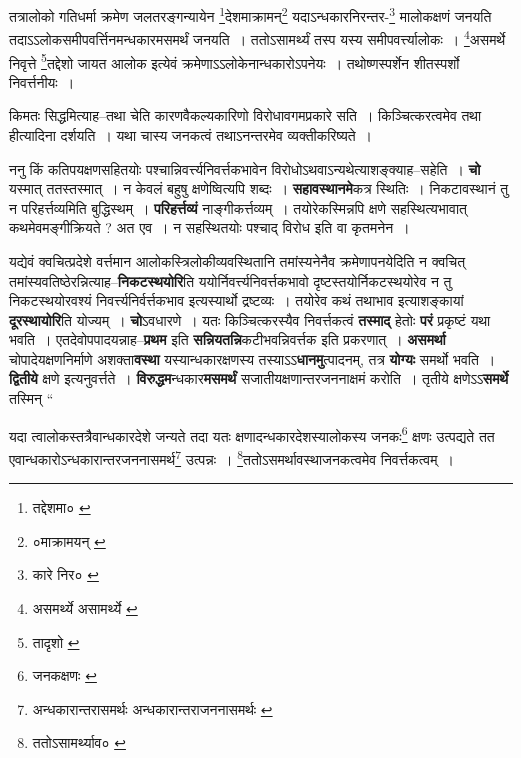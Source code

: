 \documentclass[article,12pt,a4paper]{memoir}
\begin{document}
	  \pstart तत्रालोको गतिधर्मा क्रमेण जलतरङ्गन्यायेन \footnote{तद्देशमा० \cite{dp-msC} \cite{dp-msD}}\-देशमाक्रामन्\footnote{०माक्रामयन् \cite{dp-msB} \cite{dp-edN}} यदाऽन्धकारनिरन्तर-\footnote{कारे निर० \cite{dp-msA} \cite{dp-msB} \cite{dp-edP} \cite{dp-edH} \cite{dp-edE} \cite{dp-edN}} मालोकक्षणं जनयति तदाऽऽलोकसमीपवर्त्तिनमन्धकारमसमर्थं जनयति । ततोऽसामर्थ्यं तस्प यस्य समीपवर्त्त्यालोकः । \footnote{असमर्थ्ये \cite{dp-msA} असामर्थ्ये \cite{dp-edP} \cite{dp-edH} \cite{dp-edE} \cite{dp-edN}}\-असमर्थे निवृत्ते \footnote{तादृशो \cite{dp-msA} \cite{dp-msB} \cite{dp-edP} \cite{dp-edH} \cite{dp-edN}}\-तद्देशो जायत आलोक इत्येवं क्रमेणाऽऽलोकेनान्धकारोऽपनेयः । तथोष्णस्पर्शेन शीतस्पर्शो निवर्त्तनीयः ।
	\pend
      
	  \endgroup
	

	  \pstart किमतः सिद्धमित्याह--तथा चेति कारणवैकल्यकारिणो विरोधावगमप्रकारे सति । किञ्चित्करत्वमेव तथा हीत्यादिना दर्शयति । यथा चास्य जनकत्वं तथाऽनन्तरमेव व्यक्तीकरिष्यते ।
	\pend
      

	  \pstart ननु किं कतिपयक्षणसहितयोः पश्चान्निवर्त्त्यनिवर्त्तकभावेन विरोधोऽथवाऽन्यथेत्याशङ्क्याह--सहेति । \textbf{चो} यस्मात् ततस्तस्मात् । न केवलं बहुषु क्षणेष्वित्यपि शब्दः । \textbf{सहावस्थानमे}कत्र स्थितिः । निकटावस्थानं तु न परिहर्त्तव्यमिति बुद्धिस्थम् । \textbf{परिहर्त्तव्यं} नाङ्गीकर्त्तव्यम् । तयोरेकस्मिन्नपि क्षणे सहस्थित्यभावात् कथमेवमङ्गीक्रियते ? अत एव । न सहस्थितयोः पश्चाद् विरोध इति वा कृतमनेन ।
	\pend
      

	  \pstart यद्येवं क्वचित्प्रदेशे वर्त्तमान आलोकस्त्रिलोकीव्यवस्थितानि तमांस्यनेनैव क्रमेणापनयेदिति न क्वचित् तमांस्यवतिष्ठेरन्नित्याह--\textbf{निकटस्थयोरि}ति ययोर्निवर्त्त्यनिवर्त्तकभावो दृष्टस्तयोर्निकटस्थयोरेव न तु निकटस्थयोरवश्यं निवर्त्त्यनिर्वर्त्तकभाव इत्यस्यार्थो द्रष्टव्यः । तयोरेव कथं तथाभाव इत्याशङ्कायां \textbf{दूरस्थायोरि}ति योज्यम् । \textbf{चो}ऽवधारणे । यतः किञ्चित्करस्यैव निवर्त्तकत्वं \textbf{तस्माद्} हेतोः \textbf{परं} प्रकृष्टं यथा भवति । एतदेवोपपादयन्नाह--\textbf{प्रथम} इति \textbf{सन्नियतन्नि}कटीभवन्निवर्त्तक इति प्रकरणात् । \textbf{असमर्था} चोपादेयक्षणनिर्माणे अशक्ता\textbf{वस्था} यस्यान्धकारक्षणस्य तस्याऽऽ\textbf{धानमु}त्पादनम्, तत्र \textbf{योग्यः} समर्थो भवति । \textbf{द्वितीये} क्षणे इत्यनुवर्त्तते । \textbf{विरुद्धम}न्धकार\textbf{मसमर्थं} सजातीयक्षणान्तरजननाक्षमं करोति । तृतीये क्षणेऽऽ\textbf{समर्थे} तस्मिन्  \leavevmode{} “
	  
	यदा त्वालोकस्तत्रैवान्धकारदेशे जन्यते तदा यतः क्षणादन्धकारदेशस्यालोकस्य जनकः\footnote{जनकक्षणः \cite{dp-msA} \cite{dp-msB} \cite{dp-edP} \cite{dp-edH} \cite{dp-edE} \cite{dp-edN}} क्षणः उत्पद्यते तत एवान्धकारोऽन्धकारान्तरजननासमर्थ\footnote{अन्धकारान्तरासमर्थः \cite{dp-msA} अन्धकारान्तराजननासमर्थः \cite{dp-msB} \cite{dp-msC}} उत्पन्नः । \footnote{ततोऽसामर्थ्याव० \cite{dp-msB}}\-ततोऽसमर्थावस्थाजनकत्वमेव निवर्त्तकत्वम् । 
	  
\end{document}
